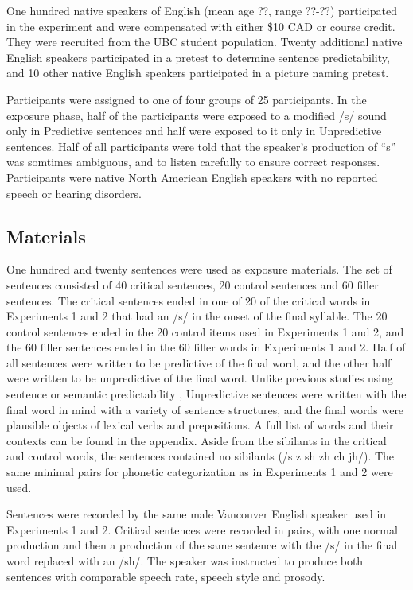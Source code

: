 One hundred native speakers of English (mean age ??, range ??-??) participated in the experiment and were compensated with either \$10 CAD or course credit. They were recruited from the UBC student population.  Twenty additional native English speakers participated in a pretest to determine sentence predictability, and 10 other native English speakers participated in a picture naming pretest.

Participants were assigned to one of four groups of 25 participants.  In the exposure phase, half of the participants were exposed to a modified /s/ sound only in Predictive sentences and half were exposed to it only in Unpredictive sentences.  Half of all participants were told that the speaker's production of ``s'' was somtimes ambiguous, and to listen carefully to ensure correct responses.  Participants were native North American English speakers with no reported speech or hearing disorders.

\subsection{Materials}

One hundred and twenty sentences were used as exposure materials.  The set of sentences consisted of 40 critical sentences, 20 control sentences and 60 filler sentences.  The critical sentences ended in one of 20 of the critical words in Experiments 1 and 2 that had an /s/ in the onset of the final syllable.  The 20 control sentences ended in the 20 control items used in Experiments 1 and 2, and the 60 filler sentences ended in the 60 filler words in Experiments 1 and 2.  Half of all sentences were written to be predictive of the final word, and the other half were written to be unpredictive of the final word.  Unlike previous studies using sentence or semantic predictability \citep{Kalikow1977}, Unpredictive sentences were written with the final word in mind with a variety of sentence structures, and the final words were plausible objects of lexical verbs and prepositions.  A full list of words and their contexts can be found in the appendix. Aside from the sibilants in the critical and control words, the sentences contained no sibilants (/s z sh zh ch jh/).  The same minimal pairs for phonetic categorization as in Experiments 1 and 2 were used.

Sentences were recorded by the same male Vancouver English speaker used in Experiments 1 and 2.  Critical sentences were recorded in pairs, with one normal production and then a production of the same sentence with the /s/ in the final word replaced with an /sh/.  The speaker was instructed to produce both sentences with comparable speech rate, speech style and prosody.

